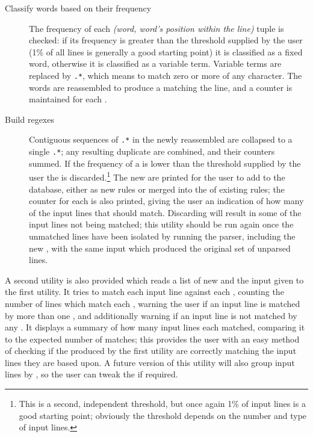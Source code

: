\documentclass[a4paper,12pt,draft]{article}
\begin{document}
\begin{description}
    \item [Classify words based on their frequency]  The frequency of each
        \textit{(word, word's position within the line)\/} tuple is
        checked: if its frequency is greater than the threshold supplied by
        the user (1\% of all lines is generally a good starting point) it
        is classified as a fixed word, otherwise it is classified as a
        variable term.  Variable terms are replaced by \texttt{.*}, which
        means to match zero or more of any character.  The words are
        reassembled to produce a \regex{} matching the line, and a counter
        is maintained for each \regex{}.

    \item [Build regexes]  Contiguous sequences of \texttt{.*} in the newly
        reassembled \regexes{} are collapsed to a single \texttt{.*}; any
        resulting duplicate \regexes{} are combined, and their counters
        summed.  If the frequency of a \regex{} is lower than the threshold
        supplied by the user the \regex{} is discarded.\footnote{This is a
        second, independent threshold, but once again 1\% of input lines is
        a good starting point; obviously the threshold depends on the
        number and type of input lines.}  The new \regexes{} are printed
        for the user to add to the database, either as new rules or merged
        into the \regexes{} of existing rules; the counter for each
        \regex{} is also printed, giving the user an indication of how many
        of the input lines that \regex{} should match.  Discarding
        \regexes{} will result in some of the input lines not being
        matched; this utility should be run again once the unmatched lines
        have been isolated by running the parser, including the new
        \regexes{}, with the same input which produced the original set of
        unparsed lines.

\end{description}

A second utility is also provided which reads a list of new \regexes{} and
the input given to the first utility.  It tries to match each input line
against each \regex{}, counting the number of lines which match each
\regex{}, warning the user if an input line is matched by more than one
\regex{}, and additionally warning if an input line is not matched by any
\regex{}.  It displays a summary of how many input lines each \regex{}
matched, comparing it to the expected number of matches; this provides the
user with an easy method of checking if the \regexes{} produced by the
first utility are correctly matching the input lines they are based upon.
A future version of this utility will also group input lines by \regex{},
so the user can tweak the \regexes{} if required.
\end{document}
